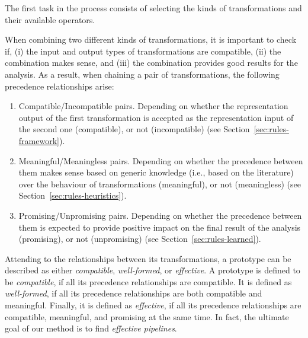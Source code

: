 The first task in the process consists of selecting the kinds of transformations and their available operators. 

When combining two different kinds of transformations, it is important to check if, (i) the input and output types of transformations are compatible, (ii) the combination makes sense, and (iii) the combination provides good results for the analysis. As a result, when chaining a pair of transformations, the following precedence relationships arise:

\begin{enumerate}
    \item Compatible/Incompatible pairs. Depending on whether the representation output of the first transformation is accepted as the representation input of the second one (compatible), or not (incompatible) (see Section~\ref{sec:rules-framework}).
    \item Meaningful/Meaningless pairs. Depending on whether the precedence between them makes sense based on generic knowledge (i.e., based on the literature) over the behaviour of transformations (meaningful), or not (meaningless) (see Section~\ref{sec:rules-heuristics}). 
    \item Promising/Unpromising pairs. Depending on whether the precedence between them is expected to provide positive impact on the final result of the analysis (promising), or not (unpromising) (see Section~\ref{sec:rules-learned}). 
\end{enumerate}

Attending to the relationships between its transformations, a prototype can be described as either \textit{compatible}, \textit{well-formed}, or \textit{effective}. A prototype is defined to be \textit{compatible}, if all its precedence relationships are compatible. It is defined as \textit{well-formed}, if all its precedence relationships are both compatible and meaningful. Finally, it is defined as \textit{effective}, if all its precedence relationships are compatible, meaningful, and promising at the same time. In fact, the ultimate goal of our method is to find \textit{effective pipelines}.

